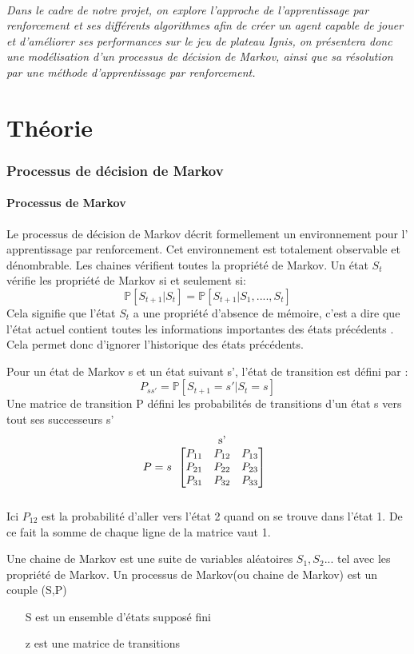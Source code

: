 \documentclass[a4paper,10pt]{article}
\begin{document}
\paragraph{
Dans le cadre de notre projet, on explore l'approche de l'apprentissage par renforcement et ses différents algorithmes afin de créer un agent capable de jouer et d'améliorer ses performances sur le jeu de plateau Ignis, on présentera donc une modélisation d'un processus de décision de Markov, ainsi que sa résolution par une méthode d'apprentissage par renforcement.
}

\part{Théorie}
\section{Processus de décision de Markov}
\subsection{Processus de Markov}
Le processus de décision de Markov décrit formellement un environnement pour l' apprentissage par renforcement. Cet environnement est totalement observable et dénombrable.
Les chaines vérifient toutes la propriété de Markov. Un état $S_t$ vérifie les propriété de Markov si et seulement si:
\[\mathbb{P}[S_{t+1}|S_t]=\mathbb{P}[S_{t+1}|S_1,....,S_t]\]
Cela signifie que l'état $S_t$ a  une propriété d'absence de mémoire, c'est a dire que l'état actuel contient toutes les informations importantes des états précédents . Cela permet donc d'ignorer l'historique des états précédents.
\par
Pour un état de Markov s et un état suivant s', l'état de transition est défini par : \[P_{ss'}=\mathbb{P}[S_{t+1}=s'|S_t=s]\]
Une matrice de transition P défini les probabilités de transitions d'un état s vers tout ses successeurs s' \[P = s
\begin{tabular}{c}
 s'\\
$$$\begin{bmatrix}
P_{11} & P_{12} & P_{13} \\
P_{21} & P_{22} & P_{23} \\
P_{31} & P_{32} & P_{33}
\end{bmatrix}$$$\\
\\
\end{tabular}\]
Ici $P_{12}$ est la probabilité d'aller vers l'état 2 quand on se trouve dans l'état 1. De ce fait la somme de chaque ligne de la matrice vaut 1.\par
Une chaine de Markov est une suite de variables aléatoires $S_1,S_2$... tel avec les propriété de Markov. Un processus de Markov(ou chaine de Markov) est un couple (S,P)
\begin{itemize}
\item[S] est un ensemble d'états supposé fini
\item[z] est une matrice de transitions 
\end{itemize}
\end{document}
